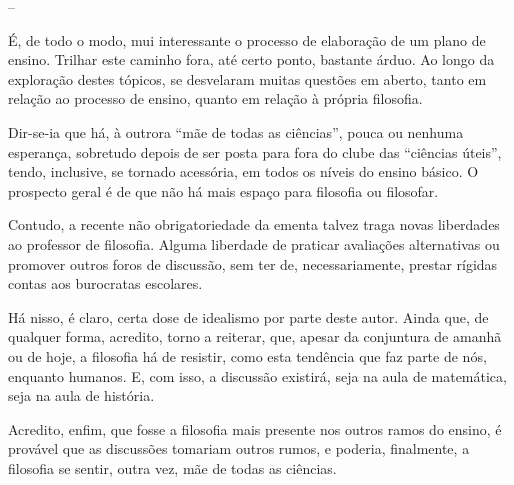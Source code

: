 \documentclass[12pt,a4paper]{article}
\begin{document}
--

	É, de todo o modo, mui interessante o processo de elaboração de um 
	plano de ensino. Trilhar este caminho fora, até certo ponto, bastante 
	árduo. Ao longo da exploração destes tópicos, se desvelaram muitas 
	questões em aberto, tanto em relação ao processo de ensino, quanto em 
	relação à própria filosofia. 

	Dir-se-ia que há, à outrora “mãe de todas as ciências”, pouca ou 
	nenhuma esperança, sobretudo depois de ser posta para fora do clube 
	das “ciências úteis”, tendo, inclusive, se tornado acessória, em todos 
	os níveis do ensino básico. O prospecto geral é de que não há mais 
	espaço para filosofia ou filosofar. 

	Contudo, a recente não obrigatoriedade da ementa talvez traga novas 
	liberdades ao professor de filosofia. Alguma liberdade de praticar 
	avaliações alternativas ou promover outros foros de discussão, sem 
	ter de, necessariamente, prestar rígidas contas aos burocratas 
	escolares. 

	Há nisso, é claro, certa dose de idealismo por parte deste autor. 
	Ainda que, de qualquer forma, acredito, torno a reiterar, que, apesar 
	da conjuntura de amanhã ou de hoje, a filosofia há de resistir, como 
	esta tendência que faz parte de nós, enquanto humanos. E, com isso, 
	a discussão existirá, seja na aula de matemática, seja na aula de 
	história. 

	Acredito, enfim, que fosse a filosofia mais presente nos outros ramos 
	do ensino, é provável que as discussões tomariam outros rumos, e 
	poderia, finalmente, a filosofia se sentir, outra vez, mãe de todas 
	as ciências. 
	
	\newpage

	
		
		
\end{document}
